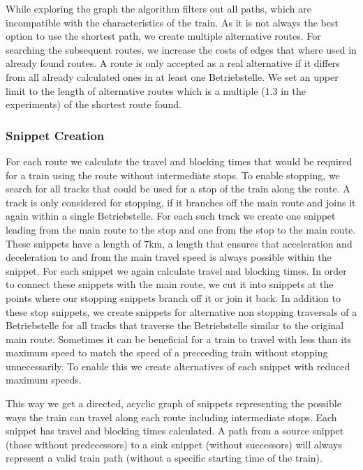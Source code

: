 While exploring the graph the algorithm filters out all paths, which are incompatible with the characteristics of the train.
As it is not always the best option to use the shortest path, we create multiple alternative routes. For searching the subsequent routes, we increase the costs of edges that where used in already found routes. A route is only accepted as a real alternative if it differs from all already calculated ones in at least one Betriebstelle. We set an upper limit to the length of alternative routes which is a multiple ($1.3$ in the experiments) of the shortest route found.


\subsubsection{Snippet Creation}
%
For each route we calculate the travel and blocking times that would be required for a train using the route without intermediate stops. To enable stopping, we search for all tracks that could be used for a stop of the train along the route. A track is only considered for stopping, if it branches off the main route and joins it again within a single Betriebstelle. For each such track we create one snippet leading from the main route to the stop and one from the stop to the main route. These snippets have a length of $7$km, a length that ensures that acceleration and deceleration to and from the main travel speed is always possible within the snippet. For each snippet we again calculate travel and blocking times. In order to connect these snippets with the main route, we cut it into snippets at the points where our stopping snippets branch off it or join it back. In addition to these stop snippets, we create snippets for alternative non stopping traversals of a Betriebstelle for all tracks that traverse the Betriebstelle similar to the original main route. Sometimes it can be beneficial for a train to travel with less than its maximum speed to match the speed of a preceeding train without stopping unnecessarily. To enable this we create alternatives of each snippet with reduced maximum speeds.

This way we get a directed, acyclic graph of snippets representing the possible ways the train can travel along each route including intermediate stops. Each snippet has travel and blocking times calculated. A path from a source snippet (those without predecessors) to a sink snippet (without successors) will always represent a valid train path (without a specific starting time of the train).


